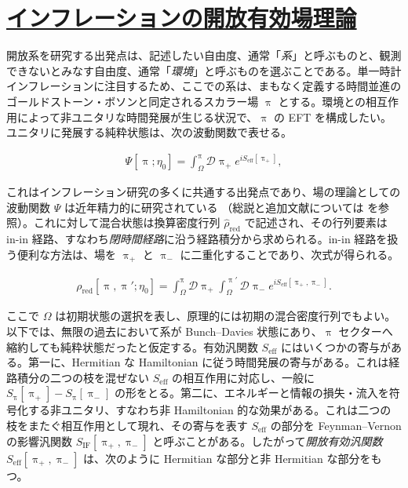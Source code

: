\documentclass[a4paper,11pt]{ltjsarticle}
\newcommand{\sectionlink}[1]{\section[#1]{\hyperlink{toc}{#1}}}
\numberwithin{equation}{section}
\newcommand{\ee}{e}
\begin{document}
\sectionlink{インフレーションの開放有効場理論}\label{sec:1}

開放系を研究する出発点は、記述したい自由度、通常「\textit{系}」と呼ぶものと、観測できないとみなす自由度、通常「\textit{環境}」と呼ぶものを選ぶことである。単一時計インフレーションに注目するため、ここでの系は、まもなく定義する時間並進のゴールドストーン・ボソンと同定されるスカラー場 $\uppi$ とする。環境との相互作用によって非ユニタリな時間発展が生じる状況で、$\uppi$ の EFT を構成したい。ユニタリに発展する純粋状態は、次の波動関数で表せる。

\begin{align}
\Psi\left[\uppi; \eta_0 \right] = \int_{\Omega}^{\uppi} \mathcal{D} \uppi_+ \ee^{i S_{\mathrm{eff}}\left[ \uppi_+\right]},
\end{align}

これはインフレーション研究の多くに共通する出発点であり、場の理論としての波動関数 $\Psi$ は近年精力的に研究されている \cite{Anninos:2014lwa,Arkani-Hamed:2017fdk,Arkani-Hamed:2018kmz,Pajer:2020wnj,Goodhew:2020hob,Cespedes:2020xqq,Goodhew:2021oqg,Melville:2021lst,Salcedo:2022aal,Baumann:2021fxj,Albayrak:2023hie,Stefanyszyn:2023qov,Sleight:2021plv,Celoria:2021vjw,Creminelli:2024cge,Chakraborty:2023yed}（総説と追加文献については \cite{Baumann:2022jpr,Benincasa:2022gtd} を参照）。これに対して混合状態は換算密度行列 $\widehat{\rho}_{\mathrm{red}}$ で記述され、その行列要素は in-in 経路、すなわち\textit{閉時間経路}に沿う経路積分から求められる。in-in 経路を扱う便利な方法は、場を $\uppi_+$ と $\uppi_-$ に二重化することであり、次式が得られる。

\begin{align}
\rho_{\mathrm{red}}\left[\uppi, \uppi';\eta_0\right] = \int_{\Omega}^\uppi \mathcal{D}\uppi_+ \int_{\Omega}^{\uppi'} \mathcal{D}\uppi_- \ee^{i S_{\mathrm{eff}}\left[ \uppi_+, \uppi_-\right]}.\label{eq:densitymatrix}
\end{align}

ここで $\Omega$ は初期状態の選択を表し、原理的には初期の混合密度行列でもよい。以下では、無限の過去において系が Bunch--Davies 状態にあり、$\uppi$ セクターへ縮約しても純粋状態だったと仮定する。有効汎関数 $S_{\mathrm{eff}}$ にはいくつかの寄与がある。第一に、Hermitian な Hamiltonian に従う時間発展の寄与がある。これは経路積分の二つの枝を混ぜない $S_{\mathrm{eff}}$ の相互作用に対応し、一般に $S_\uppi[\uppi_+]-S_\uppi[\uppi_-]$ の形をとる。第二に、エネルギーと情報の損失・流入を符号化する非ユニタリ、すなわち非 Hamiltonian 的な効果がある。これは二つの枝をまたぐ相互作用として現れ、その寄与を表す $S_{\mathrm{eff}}$ の部分を Feynman--Vernon の影響汎関数 $S_{\mathrm{IF}}[\uppi_+,\uppi_-]$ と呼ぶことがある。したがって\textit{開放有効汎関数} $S_{\mathrm{eff}}[\uppi_+,\uppi_-]$ は、次のように Hermitian な部分と非 Hermitian な部分をもつ。
\end{document}
